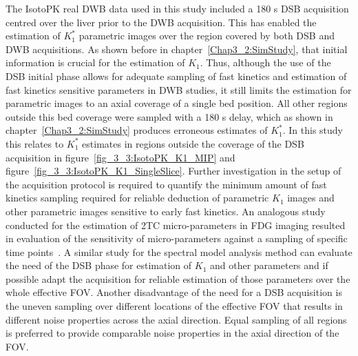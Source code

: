 The IsotoPK real DWB data used in this study included a 180 s DSB acquisition centred over the liver prior to the DWB acquisition. This has enabled the estimation of $K_1^{*}$ parametric images over the region covered by both DSB and DWB acquisitions. As shown before in chapter~\ref{Chap3_2:SimStudy}, that initial information is crucial for the estimation of $K_1$. Thus, although the use of the DSB initial phase allows for adequate sampling of fast kinetics and estimation of fast kinetics sensitive parameters in DWB studies, it still limits the estimation for parametric images to an axial coverage of a single bed position. All other regions outside this bed coverage were sampled with a 180 s delay, which as shown in chapter~\ref{Chap3_2:SimStudy} produces erroneous estimates of $K_1^{*}$. 
In this study this relates to $K_1^{*}$ estimates in regions outside the coverage of the DSB acquisition in figure~\ref{fig_3_3:IsotoPK_K1_MIP} and figure~\ref{fig_3_3:IsotoPK_K1_SingleSlice}. 
Further investigation in the setup of the acquisition protocol is required to quantify the minimum amount of fast kinetics sampling required for reliable deduction of parametric $K_1$ images and other parametric images sensitive to early fast kinetics. An analogous study conducted for the estimation of 2TC micro-parameters in FDG imaging resulted in evaluation of the sensitivity of micro-parameters against a sampling of specific time points~\cite{Zuo2019}. A similar study for the spectral model analysis method can evaluate the need of the DSB phase for estimation of $K_1$ and other parameters and if possible adapt the acquisition for reliable estimation of those parameters over the whole effective FOV. 
Another disadvantage of the need for a DSB acquisition is the uneven sampling over different locations of the effective FOV that results in different noise properties across the axial direction. Equal sampling of all regions is preferred to provide comparable noise properties in the axial direction of the FOV.

